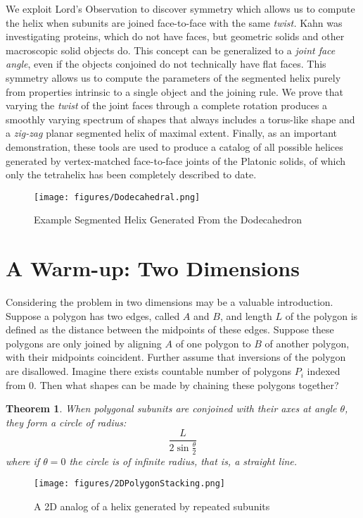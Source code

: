 \documentclass[11pt]{article}
\newtheorem{theorem}{Theorem}
\begin{document}
{We exploit Lord's Observation to discover symmetry which allows us to compute the helix when subunits are joined face-to-face with
the same {\em twist.} Kahn was investigating proteins, which do not have faces, but geometric solids and other macroscopic solid objects do.
This concept can be generalized to a {\em joint face angle}, even if the
objects conjoined do not technically have flat faces.
This symmetry allows us to compute the parameters of the segmented helix purely from
properties intrinsic to a single object and the joining rule.
We prove that varying the {\em twist} of the joint faces through a complete rotation produces a smoothly varying
spectrum of shapes that always includes a torus-like shape and a
{\em zig-zag} planar segmented helix of maximal extent.
Finally, as an important demonstration, these tools are used to produce
a catalog of all possible helices generated by vertex-matched face-to-face joints of the
Platonic solids, of which only the tetrahelix\cite{coxeter1985simplicial,sadler2019periodic,fuller1982synergetics,read2018transforming,pearce1990structure}
has been completely described to date.

\begin{figure}
     \centering
     \texttt{[image: figures/Dodecahedral.png]}
     \caption{Example Segmented Helix Generated From the Dodecahedron}
  \label{fig:dodecahedron}
\end{figure}


\section{A Warm-up: Two Dimensions}

Considering the problem in two dimensions may be a valuable introduction.
Suppose a polygon has two edges, called $A$ and $B$, and length $L$ of the
polygon is defined as the distance between the midpoints of these edges.
Suppose these
polygons are only joined by aligning $A$ of one polygon to $B$ of another polygon, with their midpoints coincident. Further assume that inversions of the polygon are disallowed.  Imagine there exists
countable number of polygons $P_i$ indexed from $0$. Then what shapes can be made by chaining these
polygons together?

\begin{theorem}
  When polygonal subunits are conjoined with their axes at angle $\theta$, they form a
  circle of radius:
  \[
\frac{L}{2 \sin{\frac{\theta}{2}}}
\]
where if $\theta = 0$ the circle is of infinite radius, that is, a straight line.
  \end{theorem}
\begin{figure}
     \centering
     \texttt{[image: figures/2DPolygonStacking.png]}
     \caption{A 2D analog of a helix generated by repeated subunits}
  \label{fig:prismdiagram}
\end{figure}

}
\end{document}
